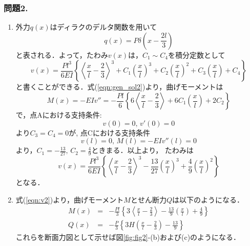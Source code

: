\documentclass[10pt,a4j]{jarticle}
\begin{document}
\subsubsection*{問題2. }
\begin{enumerate}
\item
外力$q(x)$はディラクのデルタ関数を用いて
\begin{equation}
	q(x)=P\delta \left(x-\frac{2l}{3} \right)
	\label{eqn:qx_dlt}
\end{equation}
と表される．よって，たわみ$v(x)$は，$C_1\sim C_4$を積分定数として
\begin{equation}
	v(x)=\frac{Pl^3}{6EI}\left\{
			\left< \frac{x}{l} -\frac{2}{3}\right>^3
			+
			C_1\left(\frac{x}{l}\right)^3
			+
			C_2\left(\frac{x}{l}\right)^2
			+
			C_3\left(\frac{x}{l}\right)
			+
			C_4
		\right\}
		\label{eqn:gen_sol2}
\end{equation}
	と書くことができる．式(\ref{eqn:gen_sol2})より，曲げモーメントは
\begin{equation}
	M(x)=-EIv''=-\frac{Pl}{6}\left\{
			6\left< \frac{x}{l} -\frac{2}{3}\right>
			+
			6C_1\left(\frac{x}{l}\right)
			+
			2C_2
		\right\}
\end{equation}
で，点Aにおける支持条件:
\begin{equation}
	v(0)=0,\, v'(0)=0
\end{equation}
より$C_3=C_4=0$が, 点Cにおける支持条件
\begin{equation}
	v(l)=0,\, M(l)=-EIv''(l)=0
\end{equation}
より，$C_1=-\frac{13}{27}, \, C_2=\frac{4}{9}$ときまる．以上より，
たわみは
\begin{equation}
	v(x)=\frac{Pl^3}{6EI}\left\{
			\left< \frac{x}{l} -\frac{2}{3}\right>^3
			-
			\frac{13}{27}\left(\frac{x}{l}\right)^3
			+
			\frac{4}{9}\left( \frac{x}{l} \right)^2
			\right\}
	\label{eqn:v2}
\end{equation}
となる．
\item
式(\ref{eqn:v2})より，曲げモーメント$M$とせん断力$Q$は以下のようになる．
\begin{eqnarray}
	M(x) &=& 
		-\frac{Pl}{3}
			\left\{
				3\left< \frac{x}{l} - \frac{2}{3}\right> 
				-\frac{13}{9}\left(\frac{x}{l}\right)
				+\frac{4}{9}
			\right\}
	\label{eqn:M2}
	\\
	Q(x) &=&
		-\frac{P}{3}
		\left\{
				3H\left(\frac{x}{l} -\frac{2}{3}\right)
				-
				\frac{13}{9}
		\right\}
	\label{eqn:Q2}
\end{eqnarray}
これらを断面力図として示せば図\ref{fig:fig2}-(b)および(c)のようになる．

\end{enumerate}
\end{document}
